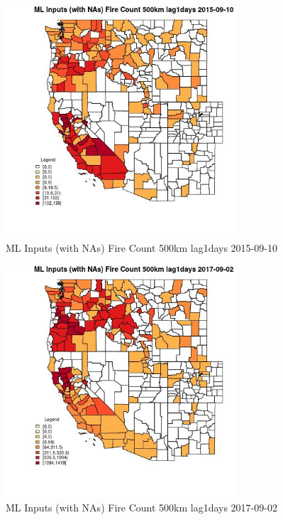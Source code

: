 \begin{figure} 
\centering  
\includegraphics[width=0.77\textwidth]{Code_Outputs/Report_ML_input_PM25_Step4_part_e_de_duplicated_aves_compiled_2019-05-20wNAs_CountyFire_Count_500km_lag1daysMean2015-09-10.jpg} 
\caption{\label{fig:Report_ML_input_PM25_Step4_part_e_de_duplicated_aves_compiled_2019-05-20wNAsCountyFire_Count_500km_lag1daysMean2015-09-10}ML Inputs (with NAs) Fire Count 500km lag1days 2015-09-10} 
\end{figure} 
 

\begin{figure} 
\centering  
\includegraphics[width=0.77\textwidth]{Code_Outputs/Report_ML_input_PM25_Step4_part_e_de_duplicated_aves_compiled_2019-05-20wNAs_CountyFire_Count_500km_lag1daysMean2017-09-02.jpg} 
\caption{\label{fig:Report_ML_input_PM25_Step4_part_e_de_duplicated_aves_compiled_2019-05-20wNAsCountyFire_Count_500km_lag1daysMean2017-09-02}ML Inputs (with NAs) Fire Count 500km lag1days 2017-09-02} 
\end{figure} 
 

